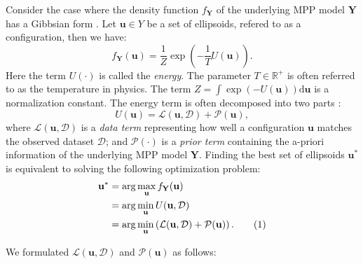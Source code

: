 \documentclass[journal]{IEEEtran}
\newcommand{\dd}[1]{\mathrm{d}#1}%
\newcommand\numberthis{\addtocounter{equation}{1}\tag{\theequation}}%
\begin{document}
Consider the case where the density function $f_{\mathbf{Y}}$ of the
underlying MPP model $\mathbf{Y}$ has a Gibbsian form
\cite{moller2007modern}. Let $\mathbf{u} \in Y$ be a set of
ellipsoids, refered to as a configuration, then we have:
\begin{equation}
  \label{eq:gibbs-density}
  f_{\mathbf{Y}}(\mathbf{u}) = \frac{1}{Z} \exp \left( - \frac{1}{T}
    U(\mathbf{u}) \right).
\end{equation}
Here the term $U(\cdot)$ is called the \textit{energy}. The parameter
$T \in \mathbb{R}^{+}$ is often referred to as the temperature in
physics. The term
$Z = \int \exp \left( -U(\mathbf{u}) \right) \dd \mathbf{u}$ is a
normalization constant. The energy term is often decomposed into two
parts \cite{lafarge2010geometric} \cite{descombes2009object}:
\begin{equation}
  \label{mpp-energy}
  U(\mathbf{u}) = \mathcal{L}(\mathbf{u}, \mathcal{D})
  + \mathcal{P} (\mathbf{u}),
\end{equation}
where $\mathcal{L}(\mathbf{u}, \mathcal{D})$ is a \textit {data term}
representing how well a configuration $\mathbf{u}$ matches the
observed dataset $\mathcal{D}$; and $\mathcal{P} (\cdot)$ is a \textit
{prior term} containing the a-priori information of the underlying MPP
model $\mathbf{Y}$. Finding the best set of ellipsoids
$\mathbf{u}^{*}$ is equivalent to solving the following optimization
problem:
\begin{align*}
  \label{mpp-opt-energy}
  \mathbf{u}^{*}
  & = \arg \max_{\mathbf{u}}{f_{\mathbf{Y}}(\mathbf{u})} \\
  & = \arg \min_{\mathbf{u}} U(\mathbf{u}, \mathcal{D}) \\
  & = \arg\min_ {\mathbf{u}} \left( \mathcal{L}(\mathbf{u},
    \mathcal{D}) + \mathcal{P} (\mathbf{u}) \right). \numberthis
\end{align*}

We formulated $\mathcal{L}(\mathbf{u}, \mathcal{D})$ and
$\mathcal{P} (\mathbf{u})$ as follows:
\end{document}
